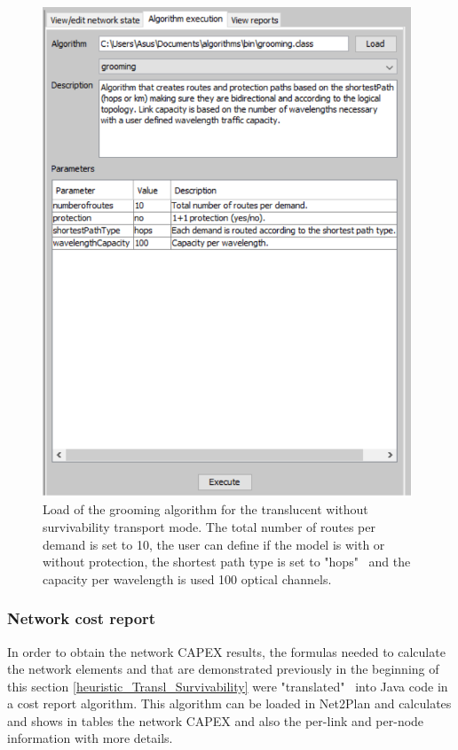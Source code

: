 \begin{figure}[H]
\centering
\includegraphics[width=11cm]{sdf/heuristic/translucent_survivability/figures/grooming_translucent_surv4}
\caption{Load of the grooming algorithm for the translucent without survivability transport mode. The total number of routes per demand is set to 10, the user can define if the model is with or without protection, the shortest path type is set to "hops" \ and the capacity per wavelength is used 100 optical channels.}
\label{grooming_translucent_surv4}
\end{figure}

\subsubsection{Network cost report}

\vspace{11pt}
In order to obtain the network CAPEX results, the formulas needed to calculate the network elements and that are demonstrated previously in the beginning of this section \ref{heuristic_Transl_Survivability} were "translated" \ into Java code in a cost report algorithm. This algorithm can be loaded in Net2Plan and calculates and shows in tables the network CAPEX and also the per-link and per-node information with more details.

